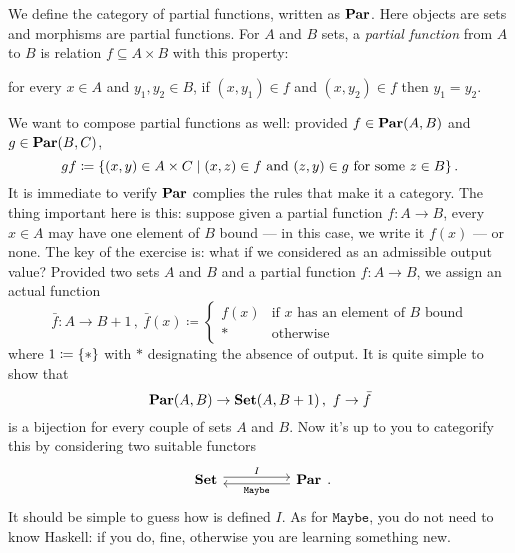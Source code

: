\begin{exercise}
 We define the category of partial functions, written as \(\mathbf{Par}\). Here objects are sets and morphisms are partial functions. For \(A\) and \(B\) sets, a {\em partial function} from \(A\) to \(B\) is relation \(f \subseteq A \times B\) with this property:
\begin{center}
for every \(x \in A\) and \(y_1, y_2 \in B\), if \((x, y_1) \in f\) and \((x, y_2) \in f\) then \(y_1 = y_2\).
\end{center}
We want to compose partial functions as well: provided \(f \in \mathbf{Par}(A, B)\) and \(g \in \mathbf{Par}(B, C)\),
\[gf \coloneq \left\{(x, y) \in A \times C \mid (x, z) \in f \text{ and } (z, y) \in g \text{ for some } z \in B\right\} .\]
It is immediate to verify \(\mathbf{Par}\) complies the rules that make it a category.\newline
The thing important here is this: suppose given a partial function \(f : A \to B\), every \(x \in A\) may have one element of \(B\) bound --- in this case, we write it \(f(x)\) --- or none. The key of the exercise is: what if we considered  as an admissible output value? Provided two sets \(A\) and \(B\) and a partial function \(f : A \to B\), we assign an actual function
\[\bar f : A \to B+1 \,, \ \bar f(x) \coloneq \begin{cases} f(x) & \text{if \(x\) has an element of \(B\) bound} \\ \ast & \text{otherwise} \end{cases}\]
where \(1 \coloneq \left\{\ast\right\}\) with \(\ast\) designating the absence of output. It is quite simple to show that
\[\mathbf{Par}(A, B) \to \mathbf{Set}(A, B+1)\,,\ f \to \bar f\]
is a bijection for every couple of sets \(A\) and \(B\). Now it's up to you to categorify this by considering two suitable functors
\[\begin{tikzcd}
\Set \ar["I", rr, shift left] & & \Par \ar["{\mathtt{Maybe}}", ll, shift left]
\end{tikzcd}.\]
It should be simple to guess how is defined \(I\). As for \(\mathtt{Maybe}\), you do not need to know Haskell: if you do, fine, otherwise you are learning something new.
\end{exercise}

